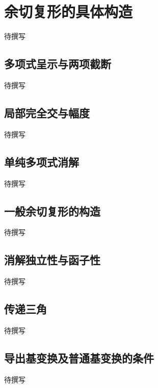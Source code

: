 
% 
% 
% 
% 
% 
% 
% 
% 
% 
% 
% 
% 
% 
% 
% 

\section{余切复形的具体构造}
\label{g5:sec:3103}

待撰写

\subsection{多项式呈示与两项截断}
\label{g5:subsec:3103:01}
待撰写

\subsection{局部完全交与幅度}
\label{g5:subsec:3103:02}
待撰写

\subsection{单纯多项式消解}
\label{g5:subsec:3103:03}
待撰写

\subsection{一般余切复形的构造}
\label{g5:subsec:3103:04}
待撰写

\subsection{消解独立性与函子性}
\label{g5:subsec:3103:05}
待撰写

\subsection{传递三角}
\label{g5:subsec:3103:06}
待撰写

\subsection{导出基变换及普通基变换的条件}
\label{g5:subsec:3103:07}
待撰写
